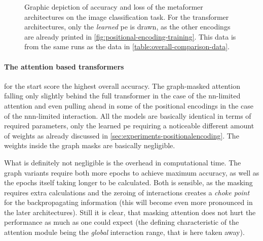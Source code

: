 \begin{figure}[p]
    \centering
    \vspace{-1cm}
    \caption{Graphic depiction of accuracy and loss of the metaformer architectures on the image classification task. 
            For the transformer architectures, only the \emph{learned} pe is drawn, as the other encodings are already printed in \autoref{fig:positional-encoding-training}. 
            This data is from the same runs as the data in \autoref{table:overall-comparison-data}.
    }
    \label{fig:overall-comparison-data}
\end{figure}

\paragraph{The attention based transformers} for the start score the highest overall accuracy. 
The graph-masked attention falling only slightly behind the full transformer in the case of the nn-limited attention and even pulling ahead in some of the positional encodings in the case of the nnn-limited interaction.
All the models are basically identical in terms of required parameters, only the learned pe requiring a noticeable different amount of weights as already discussed in \autoref{sec:experiments-positionalencoding}. 
The weights inside the graph masks are basically negligible.

What is definitely not negligible is the overhead in computational time. 
The graph variants require both more epochs to achieve maximum accuracy, as well as the epochs itself taking longer to be calculated.
Both is sensible, as the masking requires extra calculations and the zeroing of interactions creates a \emph{choke point} for the backpropagating information (this will become even more pronounced in the later architectures). 
Still it is clear, that masking attention does not hurt the performance as much as one could expect (the defining characteristic of the attention module being the \emph{global} interaction range, that is here taken away).

